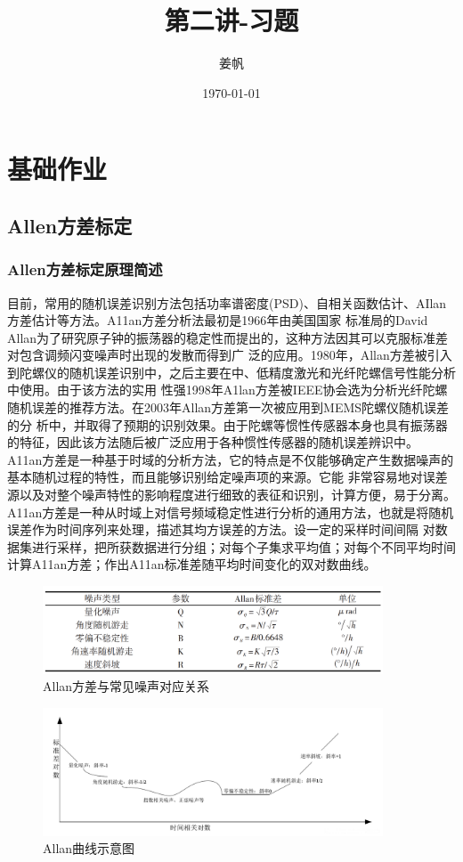 \documentclass[UTF8]{ctexart}
\title{第二讲-习题}
\author{姜帆}
\date{\today}
\begin{document}
\maketitle
\tableofcontents
\newpage
\section{基础作业}
\subsection{Allen方差标定}
\subsubsection{Allen方差标定原理简述}
\indent 目前，常用的随机误差识别方法包括功率谱密度(PSD)、自相关函数估计、AIlan方差估计等方法。A11an方差分析法最初是1966年由美国国家
标准局的David Allan为了研究原子钟的振荡器的稳定性而提出的，这种方法因其可以克服标准差对包含调频闪变噪声时出现的发散而得到广
泛的应用。1980年，Allan方差被引入到陀螺仪的随机误差识别中，之后主要在中、低精度激光和光纤陀螺信号性能分析中使用。由于该方法的实用
性强1998年A1lan方差被IEEE协会选为分析光纤陀螺随机误差的推荐方法。在2003年Allan方差第一次被应用到MEMS陀螺仪随机误差的分
析中，并取得了预期的识别效果。由于陀螺等惯性传感器本身也具有振荡器的特征，因此该方法随后被广泛应用于各种惯性传感器的随机误差辨识中。\\
\indent A11an方差是一种基于时域的分析方法，它的特点是不仅能够确定产生数据噪声的基本随机过程的特性，而且能够识别给定噪声项的来源。它能
非常容易地对误差源以及对整个噪声特性的影响程度进行细致的表征和识别，计算方便，易于分离。\\
\indent A11an方差是一种从时域上对信号频域稳定性进行分析的通用方法，也就是将随机误差作为时间序列来处理，描述其均方误差的方法。设一定的采样时间间隔
对数据集进行采样，把所获数据进行分组；对每个子集求平均值；对每个不同平均时间计算A11an方差；作出A11an标准差随平均时间变化的双对数曲线。\\
\begin{figure}[H]
\centering
\includegraphics[width=0.9\textwidth]{allen1.png}    
\caption{Allan方差与常见噪声对应关系}
\label{img0}
\end{figure}
\begin{figure}[H]
\centering
\includegraphics[width=0.9\textwidth]{allen2.png}    
\caption{Allan曲线示意图}
\label{img0}
\end{figure}
\end{document}
